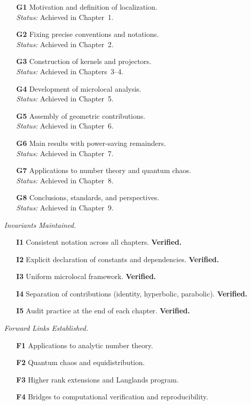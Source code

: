 \begin{itemize}
  \item[\textbf{G1}] Motivation and definition of localization. \\ \textit{Status:} Achieved in Chapter~1.
  \item[\textbf{G2}] Fixing precise conventions and notations. \\ \textit{Status:} Achieved in Chapter~2.
  \item[\textbf{G3}] Construction of kernels and projectors. \\ \textit{Status:} Achieved in Chapters~3–4.
  \item[\textbf{G4}] Development of microlocal analysis. \\ \textit{Status:} Achieved in Chapter~5.
  \item[\textbf{G5}] Assembly of geometric contributions. \\ \textit{Status:} Achieved in Chapter~6.
  \item[\textbf{G6}] Main results with power-saving remainders. \\ \textit{Status:} Achieved in Chapter~7.
  \item[\textbf{G7}] Applications to number theory and quantum chaos. \\ \textit{Status:} Achieved in Chapter~8.
  \item[\textbf{G8}] Conclusions, standards, and perspectives. \\ \textit{Status:} Achieved in Chapter~9.
\end{itemize}

\medskip

\noindent\textit{Invariants Maintained.}
\begin{itemize}
  \item[\textbf{I1}] Consistent notation across all chapters. \textbf{Verified.}
  \item[\textbf{I2}] Explicit declaration of constants and dependencies. \textbf{Verified.}
  \item[\textbf{I3}] Uniform microlocal framework. \textbf{Verified.}
  \item[\textbf{I4}] Separation of contributions (identity, hyperbolic, parabolic). \textbf{Verified.}
  \item[\textbf{I5}] Audit practice at the end of each chapter. \textbf{Verified.}
\end{itemize}

\medskip

\noindent\textit{Forward Links Established.}
\begin{itemize}
  \item[\textbf{F1}] Applications to analytic number theory.  
  \item[\textbf{F2}] Quantum chaos and equidistribution.  
  \item[\textbf{F3}] Higher rank extensions and Langlands program.  
  \item[\textbf{F4}] Bridges to computational verification and reproducibility.  
\end{itemize}

